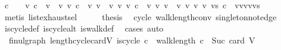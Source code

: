 \begin{isabellebody}
\ {\isachardoublequoteopen}c\ {\isacharequal}{\kern0pt}\ {\isacharbrackleft}{\kern0pt}{\isacharbrackright}{\kern0pt}{\isachardoublequoteclose}\ {\isacharbar}{\kern0pt}\ {\isachardoublequoteopen}{\isasymexists}v{}{\isachardot}{\kern0pt}\ c\ {\isacharequal}{\kern0pt}\ {\isacharbrackleft}{\kern0pt}v{}{\isacharbrackright}{\kern0pt}{\isachardoublequoteclose}\ {\isacharbar}{\kern0pt}\ {\isachardoublequoteopen}{\isasymexists}v{}\ v{}{\isachardot}{\kern0pt}\ c\ {\isacharequal}{\kern0pt}\ {\isacharbrackleft}{\kern0pt}v{}{\isacharcomma}{\kern0pt}\ v{}{\isacharbrackright}{\kern0pt}{\isachardoublequoteclose}\ {\isacharbar}{\kern0pt}\ {\isachardoublequoteopen}{\isasymexists}v{}\ v{}\ v{}{\isachardot}{\kern0pt}\ c\ {\isacharequal}{\kern0pt}\ {\isacharbrackleft}{\kern0pt}v{}{\isacharcomma}{\kern0pt}\ v{}{\isacharcomma}{\kern0pt}\ v{}{\isacharbrackright}{\kern0pt}{\isachardoublequoteclose}\ {\isacharbar}{\kern0pt}\ {\isachardoublequoteopen}{\isasymexists}v{}\ v{}\ v{}\ v{}\ vs{\isachardot}{\kern0pt}\ c\ {\isacharequal}{\kern0pt}\ v{}{\isacharhash}{\kern0pt}v{}{\isacharhash}{\kern0pt}v{}{\isacharhash}{\kern0pt}v{}{\isacharhash}{\kern0pt}vs{\isachardoublequoteclose}\isanewline
\ \ \ \ \isamarkupfalse%
\ {\isacharparenleft}{\kern0pt}metis\ list{\isachardot}{\kern0pt}exhaust{\isacharunderscore}{\kern0pt}sel{\isacharparenright}{\kern0pt}\isanewline
\ \ \isamarkupfalse%
\ \isamarkupfalse%
\ {\isacharquery}{\kern0pt}thesis\ \isamarkupfalse%
\ cycle\ walk{\isacharunderscore}{\kern0pt}length{\isacharunderscore}{\kern0pt}conv\ singleton{\isacharunderscore}{\kern0pt}not{\isacharunderscore}{\kern0pt}edge\ \isamarkupfalse%
\ is{\isacharunderscore}{\kern0pt}cycle{}{\isacharunderscore}{\kern0pt}def\ is{\isacharunderscore}{\kern0pt}cycle{\isacharunderscore}{\kern0pt}alt\ is{\isacharunderscore}{\kern0pt}walk{\isacharunderscore}{\kern0pt}def\ \isamarkupfalse%
\ {\isacharparenleft}{\kern0pt}cases{\isacharcomma}{\kern0pt}\ auto{\isacharparenright}{\kern0pt}\isanewline
{}\isamarkupfalse%
%
\endisatagproof
{\isafoldproof}%
%
\isadelimproof
\isanewline
%
\endisadelimproof
\isanewline
{}\isamarkupfalse%
\ {\isacharparenleft}{\kern0pt}\ fin{\isacharunderscore}{\kern0pt}ulgraph{\isacharparenright}{\kern0pt}\ length{\isacharunderscore}{\kern0pt}cycle{\isacharunderscore}{\kern0pt}card{\isacharunderscore}{\kern0pt}V{\isacharcolon}{\kern0pt}\ {\isachardoublequoteopen}is{\isacharunderscore}{\kern0pt}cycle\ c\ {\isasymLongrightarrow}\ walk{\isacharunderscore}{\kern0pt}length\ c\ {\isasymle}\ Suc\ {\isacharparenleft}{\kern0pt}card\ V{\isacharparenright}{\kern0pt}{\isachardoublequoteclose}\isanewline

\end{isabellebody}
